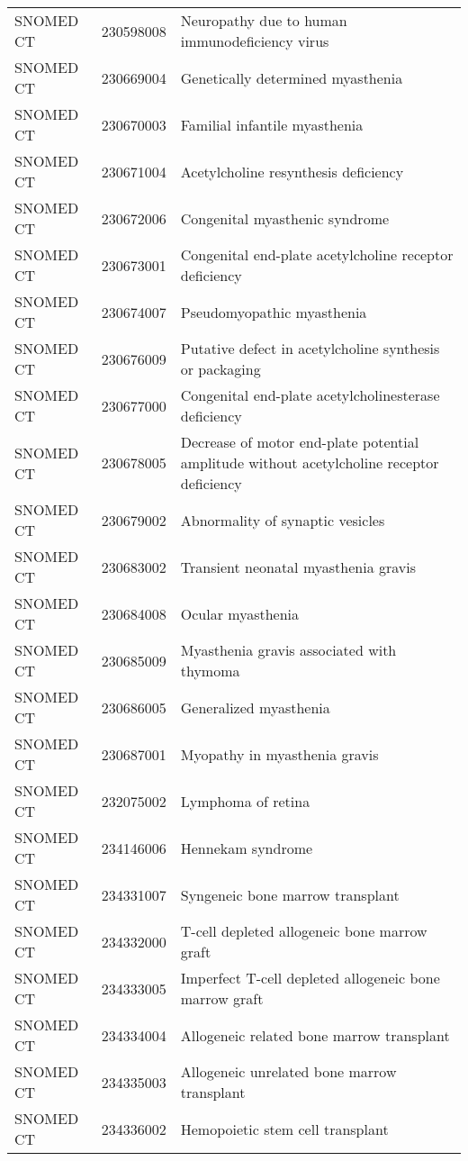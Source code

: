 \begin{longtable}{p{}p{}p{}}
  SNOMED CT & 230598008 & Neuropathy due to human immunodeficiency virus \\ 
  SNOMED CT & 230669004 & Genetically determined myasthenia \\ 
  SNOMED CT & 230670003 & Familial infantile myasthenia \\ 
  SNOMED CT & 230671004 & Acetylcholine resynthesis deficiency \\ 
  SNOMED CT & 230672006 & Congenital myasthenic syndrome \\ 
  SNOMED CT & 230673001 & Congenital end-plate acetylcholine receptor deficiency \\ 
  SNOMED CT & 230674007 & Pseudomyopathic myasthenia \\ 
  SNOMED CT & 230676009 & Putative defect in acetylcholine synthesis or packaging \\ 
  SNOMED CT & 230677000 & Congenital end-plate acetylcholinesterase deficiency \\ 
  SNOMED CT & 230678005 & Decrease of motor end-plate potential amplitude without acetylcholine receptor deficiency \\ 
  SNOMED CT & 230679002 & Abnormality of synaptic vesicles \\ 
  SNOMED CT & 230683002 & Transient neonatal myasthenia gravis \\ 
  SNOMED CT & 230684008 & Ocular myasthenia \\ 
  SNOMED CT & 230685009 & Myasthenia gravis associated with thymoma \\ 
  SNOMED CT & 230686005 & Generalized myasthenia \\ 
  SNOMED CT & 230687001 & Myopathy in myasthenia gravis \\ 
  SNOMED CT & 232075002 & Lymphoma of retina \\ 
  SNOMED CT & 234146006 & Hennekam syndrome \\ 
  SNOMED CT & 234331007 & Syngeneic bone marrow transplant \\ 
  SNOMED CT & 234332000 & T-cell depleted allogeneic bone marrow graft \\ 
  SNOMED CT & 234333005 & Imperfect T-cell depleted allogeneic bone marrow graft \\ 
  SNOMED CT & 234334004 & Allogeneic related bone marrow transplant \\ 
  SNOMED CT & 234335003 & Allogeneic unrelated bone marrow transplant \\ 
  SNOMED CT & 234336002 & Hemopoietic stem cell transplant \\ 

\end{longtable}
